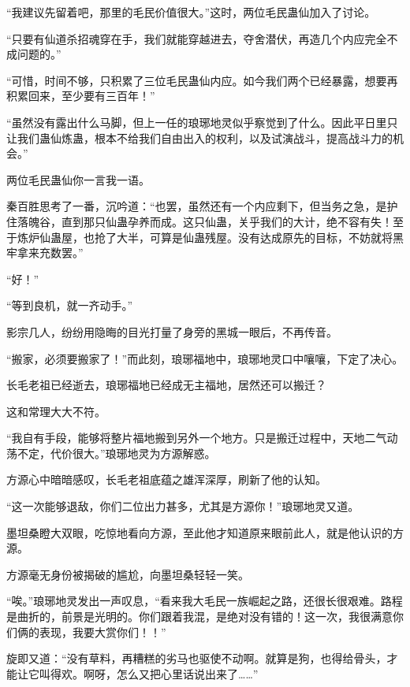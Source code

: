 \begin{this_body}
“我建议先留着吧，那里的毛民价值很大。”这时，两位毛民蛊仙加入了讨论。

“只要有仙道杀招魂穿在手，我们就能穿越进去，夺舍潜伏，再造几个内应完全不成问题的。”

“可惜，时间不够，只积累了三位毛民蛊仙内应。如今我们两个已经暴露，想要再积累回来，至少要有三百年！”

“虽然没有露出什么马脚，但上一任的琅琊地灵似乎察觉到了什么。因此平日里只让我们蛊仙炼蛊，根本不给我们自由出入的权利，以及试演战斗，提高战斗力的机会。”

两位毛民蛊仙你一言我一语。

秦百胜思考了一番，沉吟道：“也罢，虽然还有一个内应剩下，但当务之急，是护住落魄谷，直到那只仙蛊孕养而成。这只仙蛊，关乎我们的大计，绝不容有失！至于炼炉仙蛊屋，也抢了大半，可算是仙蛊残屋。没有达成原先的目标，不妨就将黑牢拿来充数罢。”

“好！”

“等到良机，就一齐动手。”

影宗几人，纷纷用隐晦的目光打量了身旁的黑城一眼后，不再传音。

“搬家，必须要搬家了！”而此刻，琅琊福地中，琅琊地灵口中嚷嚷，下定了决心。

长毛老祖已经逝去，琅琊福地已经成无主福地，居然还可以搬迁？

这和常理大大不符。

“我自有手段，能够将整片福地搬到另外一个地方。只是搬迁过程中，天地二气动荡不定，代价很大。”琅琊地灵为方源解惑。

方源心中暗暗感叹，长毛老祖底蕴之雄浑深厚，刷新了他的认知。

“这一次能够退敌，你们二位出力甚多，尤其是方源你！”琅琊地灵又道。

墨坦桑瞪大双眼，吃惊地看向方源，至此他才知道原来眼前此人，就是他认识的方源。

方源毫无身份被揭破的尴尬，向墨坦桑轻轻一笑。

“唉。”琅琊地灵发出一声叹息，“看来我大毛民一族崛起之路，还很长很艰难。路程是曲折的，前景是光明的。你们跟着我混，是绝对没有错的！这一次，我很满意你们俩的表现，我要大赏你们！！”

旋即又道：“没有草料，再糟糕的劣马也驱使不动啊。就算是狗，也得给骨头，才能让它叫得欢。啊呀，怎么又把心里话说出来了……”

\end{this_body}

